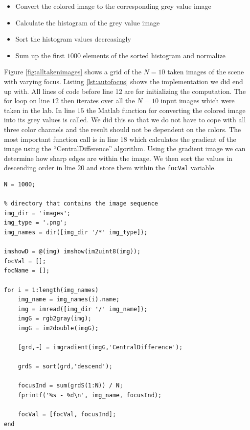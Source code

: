 \documentclass[
a4paper,     %
12pt         %
]{scrartcl}  %
\begin{document}
\begin{itemize}
 \item Convert the colored image to the corresponding grey value image
 \item Calculate the histogram of the grey value image
 \item Sort the histogram values decreasingly
 \item Sum up the first $1000$ elements of the sorted histogram and normalize
\end{itemize}

Figure \ref{fig:alltakenimages} shows a grid of the $N=10$ taken images of the scene with varying focus.
Listing \ref{lst:autofocus} shows the implementation we did end up with.
All lines of code before line 12 are for initializing the computation.
The for loop on line $12$ then iterates over all the $N=10$ input images which were taken in the lab.
In line $15$ the Matlab function for converting the colored image into its grey values is called.
We did this so that we do not have to cope with all three color channels and the result should not be dependent on the colors.
The most important function call is in line $18$ which calculates the gradient of the image using the ``CentralDifference'' algorithm.
Using the gradient image we can determine how sharp edges are within the image.
We then sort the values in descending order in line $20$ and store them within the \lstinline{focVal} variable.

\begin{lstlisting}[label=lst:autofocus, caption=Matlab script for calculating best focus value]
N = 1000;

% directory that contains the image sequence
img_dir = 'images';
img_type = '.png';
img_names = dir([img_dir '/*' img_type]);

imshowD = @(img) imshow(im2uint8(img));
focVal = [];
focName = [];

for i = 1:length(img_names)
    img_name = img_names(i).name;
    img = imread([img_dir '/' img_name]);
    imgG = rgb2gray(img);
    imgG = im2double(imgG);
    
    [grd,~] = imgradient(imgG,'CentralDifference');
    
    grdS = sort(grd,'descend');
    
    focusInd = sum(grdS(1:N)) / N;
    fprintf('%s - %d\n', img_name, focusInd);
    
    focVal = [focVal, focusInd];
end
\end{lstlisting}
\end{document}
